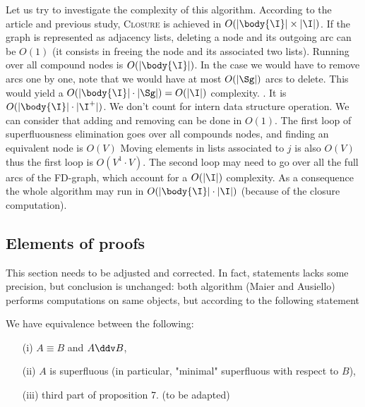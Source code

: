 Let us try to investigate the complexity of this algorithm. According to the 
article and previous study, \textsc{Closure} is achieved in $O(|\body{\I}| 
\times |\I|)$. If the graph is
represented as adjacency lists, deleting a node and its outgoing arc can be
$O(1)$ (it consists in freeing the node and its associated two lists). Running 
over all compound nodes is $O(|\body{\I}|)$. In the case we would have to 
remove arcs one by one, note that we would have at most $O(|\Sg|)$ arcs to 
delete. This would yield a $O(|\body{\I}| \cdot |\Sg|) = O(|\I|)$
complexity. . It is $O(|\body{\I}| \cdot 
|\I^{+}|)$. We don't count for intern data structure operation. We can consider
that adding and removing can be done in $O(1)$. The first loop of 
superfluousness elimination goes over all compounds nodes, and finding an 
equivalent node is $O(V)$ Moving elements in lists associated to $j$ is also
$O(V)$ thus the first loop is $O(V^1 \cdot V)$. The second loop may need to 
go over all the full arcs of the FD-graph, which account for a $O(|\I|)$ 
complexity. As a consequence the whole algorithm may run in $O(|\body{\I}| 
\cdot |\I|)$ (because of the closure computation).



\subsection{Elements of proofs}

{\color{alizarine}
This section needs to be adjusted and corrected. In fact, statements lacks
some precision, but conclusion is unchanged: both algorithm (Maier and 
Ausiello) performs computations on same objects, but according to the 
following statement 

\begin{proposition} We have equivalence between the following:
\begin{itemize}
	\item[(i)] $A \equiv B$ and $A \ddv B$,
	\item[(ii)] $A$ is superfluous (in particular, "minimal" superfluous with 
	respect to $B$),
	\item[(iii)] third part of proposition 7. (to be adapted)
\end{itemize}
	
\end{proposition}	
	
	
}

